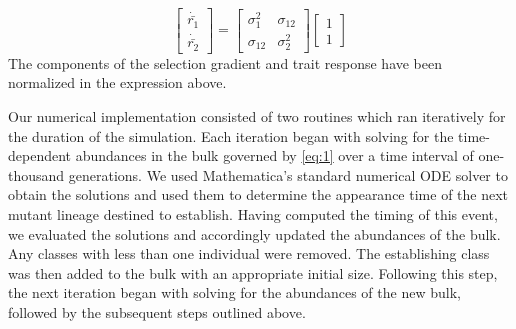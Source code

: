 \documentclass[11pt,twocolumn]{article}
\begin{document}
% 
% 
% 
% 
% 
% 
\begin{equation}\label{eq:5}
\left[
\begin{array}{c}
\dot{\bar{r_1}} \\
\dot{\bar{r_2}} 
\end{array}
\right]
=
\left[
\begin{array}{cc}
\sigma_1^2 & \sigma_{12} \\
\sigma_{12} & \sigma_2^2 
\end{array}
\right]
\left[
\begin{array}{c}
1 \\
1 
\end{array}
\right]
\end{equation}
The components of the selection gradient and trait response have been normalized in the expression above. \par

Our numerical implementation consisted of two routines which ran iteratively for the duration of the simulation. Each iteration began with solving for the time-dependent abundances in the bulk governed by \eqref{eq:1} over a time interval of one-thousand generations. We used Mathematica's standard numerical ODE solver to obtain the solutions and used them to determine the appearance time of the next mutant lineage destined to establish. Having computed the timing of this event, we evaluated the solutions and accordingly updated the abundances of the bulk. Any classes with less than one individual were removed.  The establishing class was then added to the bulk with an appropriate initial size. Following this step, the next iteration began with solving for the abundances of the new bulk, followed by the subsequent steps outlined above.\par
\end{document}
